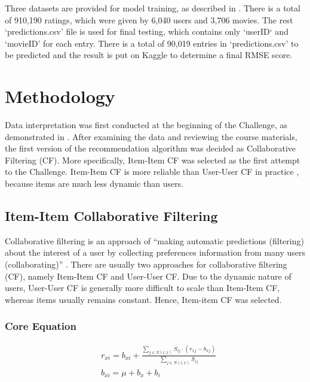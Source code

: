 \documentclass{ece}
\begin{document}
Three datasets are provided for model training, as described in .
There is a total of 910,190 ratings, which were given by 6,040 users and 3,706 movies.
The rest `predictions.csv' file is used for final testing, which contains only `userID` and `movieID' for each entry.
There is a total of 90,019 entries in `predictions.csv' to be predicted and the result is put on Kaggle to determine a final RMSE score.


\section{Methodology}

Data interpretation was first conducted at the beginning of the Challenge, as demonstrated in .
After examining the data and reviewing the course materials, the first version of the recommendation algorithm was decided as Collaborative Filtering (CF).
More specifically, Item-Item CF was selected as the first attempt to the Challenge.
Item-Item CF is more reliable than User-User CF in practice \cite{mmds}, because items are much less dynamic than users.

\subsection{Item-Item Collaborative Filtering}
\label{item-item-cf}

Collaborative filtering is an approach of ``making automatic predictions (filtering) about the interest of a user by collecting preferences information from many users (collaborating)'' \cite{wiki_cf}.
There are usually two approaches for collaborative filtering (CF), namely Item-Item CF and User-User CF.
Due to the dynamic nature of users, User-User CF is generally more difficult to scale than Item-Item CF, whereas items usually remains constant.
Hence, Item-item CF was selected.

\subsubsection{Core Equation}

\begin{equation}
	\begin{aligned}\label{eq:1}
& r_{xi} = b_{xi} + \frac{\sum\limits_{j\in N(i;x)} S_{ij} \cdot (r_{xj} - b_{xj}) }{\sum\limits_{j\in N(i;x)} S_{ij}}  \\
& b_{xi} = \mu + b_x + b_i
	\end{aligned}
\end{equation}
\end{document}
